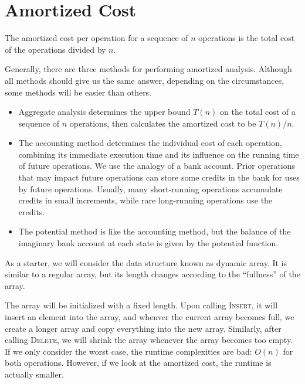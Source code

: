 \section{Amortized Cost}

\vspace{\parskip}

\begin{definition} 
    The amortized cost per operation for a sequence of $n$ operations is the total cost of the operations divided by $n$.
\end{definition}

Generally, there are three methods for performing amortized analysis. Although all methods should give us the same answer, depending on the circumstances, some methods will be easier than others.

\begin{itemize}
    \item Aggregate analysis determines the upper bound $T(n)$ on the total cost of a sequence of $n$
    operations, then calculates the amortized cost to be $T(n) / n$.
    \item The accounting method determines the individual cost of each operation, combining its immediate execution time and its influence on the running time of future operations. We use the analogy of a bank account. Prior operations that may impact future operations can store some credits in the bank for uses by future operations. Usually, many short-running operations accumulate credits in small increments, while rare long-running operations use the credits.
    \item The potential method is like the accounting method, but the balance of the imaginary bank account at each state is given by the potential function.
\end{itemize}

As a starter, we will consider the data structure known as dynamic array. It is similar to a regular array, but its length changes according to the ``fullness'' of the array.


The array will be initialized with a fixed length. Upon calling \textsc{Insert}, it will insert an element into the array, and whenver the current array becomes full, we create a longer array and copy everything into the new array. Similarly, after calling \textsc{Delete}, we will shrink the array whenever the array becomes too empty. If we only consider the worst case, the runtime complexities are bad: $O(n)$ for both operations. However, if we look at the amortized cost, the runtime is actually smaller.


